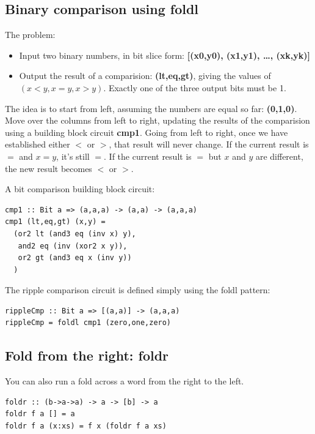 \documentclass[]{svmono}
\begin{document}
\subsection*{Binary comparison using foldl}
\label{sec:org893873a}

The problem:

\begin{itemize}
\item Input two binary numbers, in bit slice form:  \textbf{{[}(x0,y0), (x1,y1), \ldots{}, (xk,yk)]}
\item Output the result of a comparision: \textbf{(lt,eq,gt)}, giving the values
of \((x<y, x=y, x>y)\).  Exactly one of the three output bits must
be 1.
\end{itemize}

The idea is to start from left, assuming the numbers are equal so far:
\textbf{(0,1,0)}.  Move over the columns from left to right, updating the
results of the comparision using a building block circuit \textbf{cmp1}.
Going from left to right, once we have established either \(<\) or \(>\),
that result will never change.  If the current result is \(=\) and
\(x=y\), it's still \(=\).  If the current result is \(=\) but \(x\) and \(y\)
are different, the new result becomes \(<\) or \(>\).

A bit comparison building block circuit:

\begin{verbatim}
cmp1 :: Bit a => (a,a,a) -> (a,a) -> (a,a,a)
cmp1 (lt,eq,gt) (x,y) =
  (or2 lt (and3 eq (inv x) y),
   and2 eq (inv (xor2 x y)),
   or2 gt (and3 eq x (inv y))
  )
\end{verbatim}

The ripple comparison circuit is defined simply using the foldl pattern:

\begin{verbatim}
rippleCmp :: Bit a => [(a,a)] -> (a,a,a)
rippleCmp = foldl cmp1 (zero,one,zero)
\end{verbatim}
\subsection*{Fold from the right: foldr}
\label{sec:org77656b5}

You can also run a fold across a word from the right to the left.

\begin{verbatim}
foldr :: (b->a->a) -> a -> [b] -> a
foldr f a [] = a
foldr f a (x:xs) = f x (foldr f a xs)
\end{verbatim}
\end{document}
